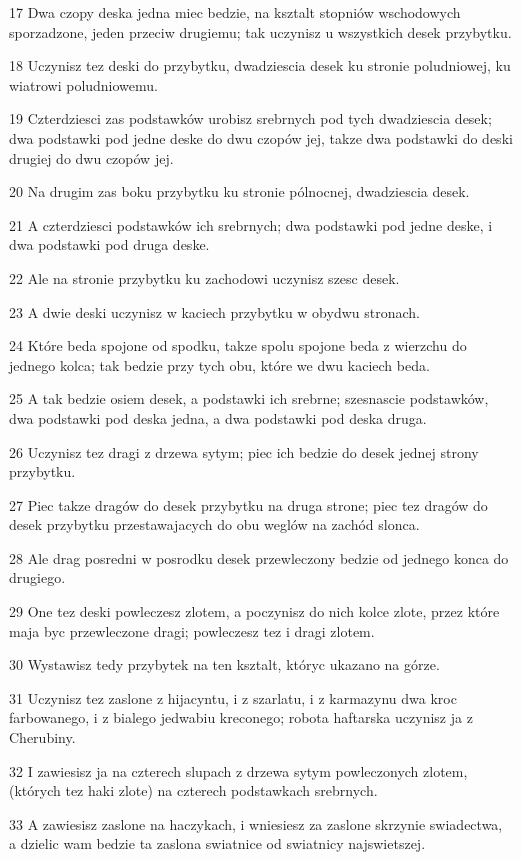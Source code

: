 \par 17 Dwa czopy deska jedna miec bedzie, na ksztalt stopniów wschodowych sporzadzone, jeden przeciw drugiemu; tak uczynisz u wszystkich desek przybytku.
\par 18 Uczynisz tez deski do przybytku, dwadziescia desek ku stronie poludniowej, ku wiatrowi poludniowemu.
\par 19 Czterdziesci zas podstawków urobisz srebrnych pod tych dwadziescia desek; dwa podstawki pod jedne deske do dwu czopów jej, takze dwa podstawki do deski drugiej do dwu czopów jej.
\par 20 Na drugim zas boku przybytku ku stronie pólnocnej, dwadziescia desek.
\par 21 A czterdziesci podstawków ich srebrnych; dwa podstawki pod jedne deske, i dwa podstawki pod druga deske.
\par 22 Ale na stronie przybytku ku zachodowi uczynisz szesc desek.
\par 23 A dwie deski uczynisz w kaciech przybytku w obydwu stronach.
\par 24 Które beda spojone od spodku, takze spolu spojone beda z wierzchu do jednego kolca; tak bedzie przy tych obu, które we dwu kaciech beda.
\par 25 A tak bedzie osiem desek, a podstawki ich srebrne; szesnascie podstawków, dwa podstawki pod deska jedna, a dwa podstawki pod deska druga.
\par 26 Uczynisz tez dragi z drzewa sytym; piec ich bedzie do desek jednej strony przybytku.
\par 27 Piec takze dragów do desek przybytku na druga strone; piec tez dragów do desek przybytku przestawajacych do obu weglów na zachód slonca.
\par 28 Ale drag posredni w posrodku desek przewleczony bedzie od jednego konca do drugiego.
\par 29 One tez deski powleczesz zlotem, a poczynisz do nich kolce zlote, przez które maja byc przewleczone dragi; powleczesz tez i dragi zlotem.
\par 30 Wystawisz tedy przybytek na ten ksztalt, któryc ukazano na górze.
\par 31 Uczynisz tez zaslone z hijacyntu, i z szarlatu, i z karmazynu dwa kroc farbowanego, i z bialego jedwabiu kreconego; robota haftarska uczynisz ja z Cherubiny.
\par 32 I zawiesisz ja na czterech slupach z drzewa sytym powleczonych zlotem, (których tez haki zlote) na czterech podstawkach srebrnych.
\par 33 A zawiesisz zaslone na haczykach, i wniesiesz za zaslone skrzynie swiadectwa, a dzielic wam bedzie ta zaslona swiatnice od swiatnicy najswietszej.
